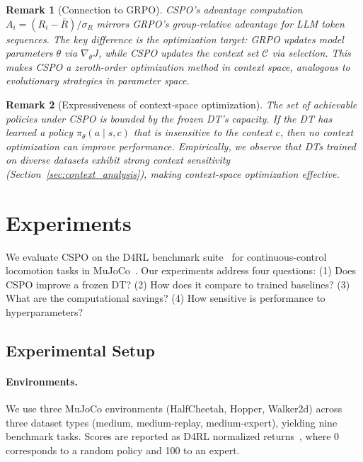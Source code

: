 \documentclass{article}
\newtheorem{remark}{Remark}
\newcommand{\cspo}{\textsc{CSPO}}
\newcommand{\grpo}{\textsc{GRPO}}
\newcommand{\cC}{\mathcal{C}}
\begin{document}
\begin{remark}[Connection to \grpo{}]
\label{rem:grpo}
\cspo{}'s advantage computation $A_i = (R_i - \bar{R}) / \sigma_R$ mirrors \grpo{}'s group-relative advantage for LLM token sequences. The key difference is the optimization target: \grpo{} updates model parameters $\theta$ via $\nabla_\theta J$, while \cspo{} updates the context set $\cC$ via selection. This makes \cspo{} a zeroth-order optimization method in context space, analogous to evolutionary strategies in parameter space.
\end{remark}

\begin{remark}[Expressiveness of context-space optimization]
\label{rem:expressiveness}
The set of achievable policies under \cspo{} is bounded by the frozen DT's capacity. If the DT has learned a policy $\pi_\theta(a \mid s, c)$ that is insensitive to the context $c$, then no context optimization can improve performance. Empirically, we observe that DTs trained on diverse datasets exhibit strong context sensitivity (Section~\ref{sec:context_analysis}), making context-space optimization effective.
\end{remark}


\section{Experiments}
\label{sec:experiments}

We evaluate \cspo{} on the D4RL benchmark suite~\citep{fu2020d4rl} for continuous-control locomotion tasks in MuJoCo~\citep{todorov2012mujoco}. Our experiments address four questions: (1) Does \cspo{} improve a frozen DT? (2) How does it compare to trained baselines? (3) What are the computational savings? (4) How sensitive is performance to hyperparameters?

\subsection{Experimental Setup}
\label{sec:setup}

\paragraph{Environments.} We use three MuJoCo environments (HalfCheetah, Hopper, Walker2d) across three dataset types (medium, medium-replay, medium-expert), yielding nine benchmark tasks. Scores are reported as D4RL normalized returns~\citep{fu2020d4rl}, where 0 corresponds to a random policy and 100 to an expert.
\end{document}

